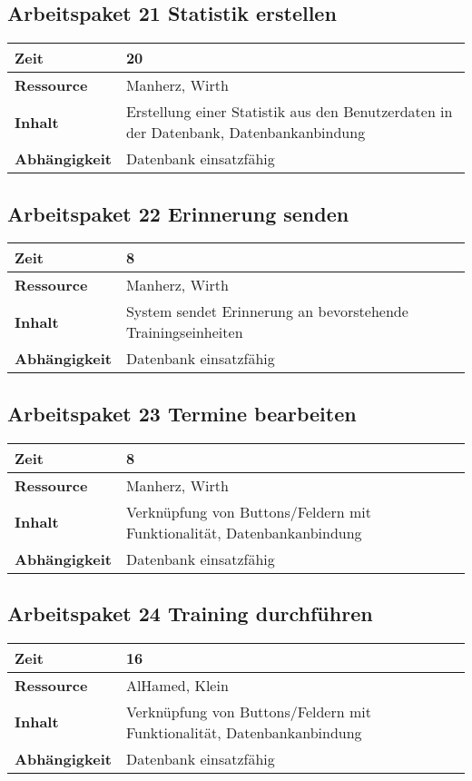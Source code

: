 \documentclass[12pt,a4paper,onecolumn]{article}
\begin{document}
\subsection{Arbeitspaket 21 Statistik erstellen}
\begin{tabularx}{\textwidth}{|l|X|}
\hline
     \textbf{Zeit} & 20\\
     \hline
     \textbf{Ressource} & Manherz, Wirth\\
     \hline
     \textbf{Inhalt} & Erstellung einer Statistik aus den Benutzerdaten in der Datenbank, Datenbankanbindung\\
     \hline
     \textbf{Abhängigkeit} & Datenbank einsatzfähig\\
\hline
\end{tabularx}
\subsection{Arbeitspaket 22 Erinnerung senden}
\begin{tabularx}{\textwidth}{|l|X|}
\hline
     \textbf{Zeit} & 8\\
     \hline
     \textbf{Ressource} & Manherz, Wirth \\
     \hline
     \textbf{Inhalt} &  System sendet Erinnerung an bevorstehende Trainingseinheiten\\
     \hline
     \textbf{Abhängigkeit} & Datenbank einsatzfähig\\
\hline
\end{tabularx}
\subsection{Arbeitspaket 23 Termine bearbeiten}
\begin{tabularx}{\textwidth}{|l|X|}
\hline
     \textbf{Zeit} & 8\\
     \hline
     \textbf{Ressource} & Manherz, Wirth\\
     \hline
     \textbf{Inhalt} &  Verknüpfung von Buttons/Feldern mit Funktionalität, Datenbankanbindung\\
     \hline
     \textbf{Abhängigkeit} & Datenbank einsatzfähig\\
\hline
\end{tabularx}
\subsection{Arbeitspaket 24 Training durchführen}
\begin{tabularx}{\textwidth}{|l|X|}
\hline
     \textbf{Zeit} & 16\\
     \hline
     \textbf{Ressource} & AlHamed, Klein\\
     \hline
     \textbf{Inhalt} &  Verknüpfung von Buttons/Feldern mit Funktionalität, Datenbankanbindung\\
     \hline
     \textbf{Abhängigkeit} & Datenbank einsatzfähig\\
\hline
\end{tabularx}
\end{document}

